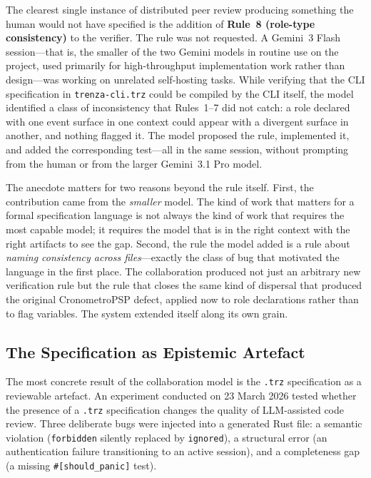 The clearest single instance of distributed peer review producing something the
human would not have specified is the addition of \textbf{Rule~8
(role-type consistency)} to the verifier. The rule was not requested. A
Gemini~3 Flash session---that is, the smaller of the two Gemini models in
routine use on the project, used primarily for high-throughput implementation
work rather than design---was working on unrelated self-hosting tasks. While
verifying that the CLI specification in \texttt{trenza-cli.trz} could be
compiled by the CLI itself, the model identified a class of inconsistency that
Rules~1--7 did not catch: a role declared with one event surface in one context
could appear with a divergent surface in another, and nothing flagged it. The
model proposed the rule, implemented it, and added the corresponding test---all
in the same session, without prompting from the human or from the larger
Gemini~3.1 Pro model.

The anecdote matters for two reasons beyond the rule itself. First, the
contribution came from the \emph{smaller} model. The kind of work that matters
for a formal specification language is not always the kind of work that requires
the most capable model; it requires the model that is in the right context with
the right artifacts to see the gap. Second, the rule the model added is a rule
about \emph{naming consistency across files}---exactly the class of bug that
motivated the language in the first place. The collaboration produced not just
an arbitrary new verification rule but the rule that closes the same kind of
dispersal that produced the original CronometroPSP defect, applied now to role
declarations rather than to flag variables. The system extended itself along
its own grain.

\subsection{The Specification as Epistemic Artefact}
\label{sec:epistemic}

The most concrete result of the collaboration model is the \texttt{.trz}
specification as a reviewable artefact. An experiment conducted on 23 March
2026 tested whether the presence of a \texttt{.trz} specification changes the
quality of LLM-assisted code review. Three deliberate bugs were injected into
a generated Rust file: a semantic violation (\texttt{forbidden} silently
replaced by \texttt{ignored}), a structural error (an authentication failure
transitioning to an active session), and a completeness gap (a missing
\texttt{\#[should\_panic]} test).

